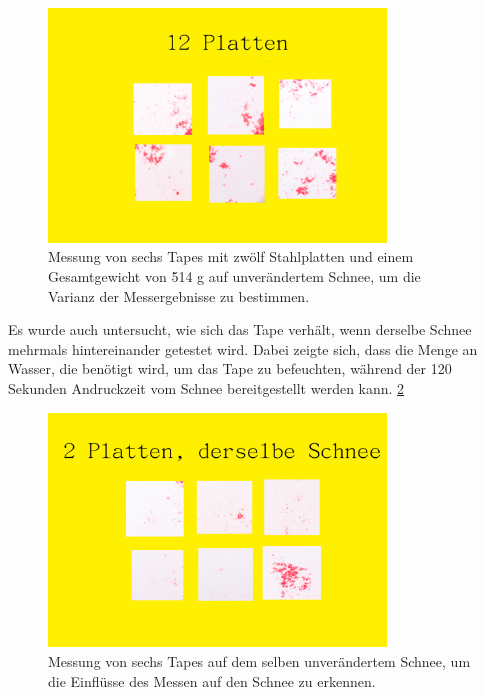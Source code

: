 \begin{figure}[H]
    \centering
    \includegraphics[width=0.8\textwidth]{Bilder/12Platten.png}
    \caption{Messung von sechs Tapes mit  zwölf Stahlplatten und einem Gesamtgewicht von 514 g auf unverändertem Schnee, um die Varianz der Messergebnisse zu bestimmen.} 
    \label{fig:12Palt}
\end{figure}

\newpage
Es wurde auch untersucht, wie sich das Tape verhält, wenn derselbe Schnee mehrmals hintereinander getestet wird. Dabei zeigte sich, dass die Menge an Wasser, die benötigt wird, um das Tape zu befeuchten, während der 120 Sekunden Andruckzeit vom Schnee bereitgestellt werden kann. \ref{fig:aufbauTitlis}


\begin{figure}[H]
    \centering
    \includegraphics[width=0.8\textwidth]{Bilder/2PlattenSelberSchnee.png}
    \caption{Messung von sechs Tapes auf dem selben unverändertem Schnee, um die Einflüsse des Messen auf den Schnee zu erkennen.} 
    \label{fig:aufbauTitlis}
\end{figure}
